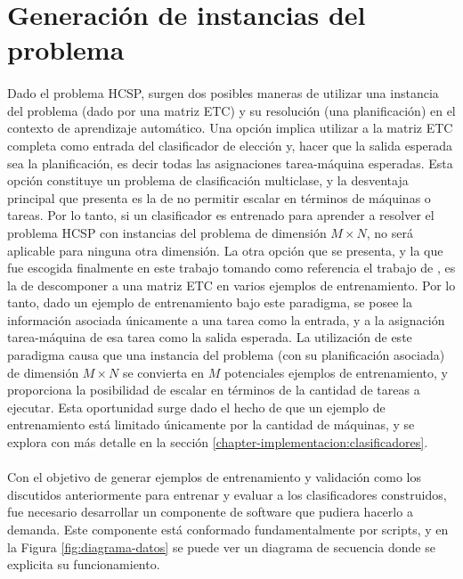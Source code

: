 \section{Generación de instancias del problema} \label{chapter-implementacion:data}

\paragraph{} Dado el problema HCSP, surgen dos posibles maneras de utilizar una instancia del problema (dado por una matriz ETC) y su resolución (una planificación) en el contexto de aprendizaje automático.
Una opción implica utilizar a la matriz ETC completa como entrada del clasificador de elección y, hacer que la salida esperada sea la planificación, es decir todas las asignaciones tarea-máquina esperadas.
Esta opción constituye un problema de clasificación multiclase, y la desventaja principal que presenta es la de no permitir escalar en términos de máquinas o tareas.
Por lo tanto, si un clasificador es entrenado para aprender a resolver el problema HCSP con instancias del problema de dimensión $M \times N$, no será aplicable para ninguna otra dimensión.
La otra opción que se presenta, y la que fue escogida finalmente en este trabajo tomando como referencia el trabajo de \citet{savant-original}, es la de descomponer a una matriz ETC en varios ejemplos de entrenamiento.
Por lo tanto, dado un ejemplo de entrenamiento bajo este paradigma, se posee la información asociada únicamente a una tarea como la entrada, y a la asignación tarea-máquina de esa tarea como la salida esperada.
La utilización de este paradigma causa que una instancia del problema (con su planificación asociada) de dimensión $M \times N$ se convierta en $M$ potenciales ejemplos de entrenamiento, y proporciona la posibilidad de escalar en términos de la cantidad de tareas a ejecutar.
Esta oportunidad surge dado el hecho de que un ejemplo de entrenamiento está limitado únicamente por la cantidad de máquinas, y se explora con más detalle en la sección \ref{chapter-implementacion:clasificadores}.


\paragraph{} Con el objetivo de generar ejemplos de entrenamiento y validación como los discutidos anteriormente para entrenar y evaluar a los clasificadores construidos, fue necesario desarrollar un componente de software que pudiera hacerlo a demanda.
Este componente está conformado fundamentalmente por scripts, y en la Figura \ref{fig:diagrama-datos} se puede ver un diagrama de secuencia donde se explicita su funcionamiento. 

